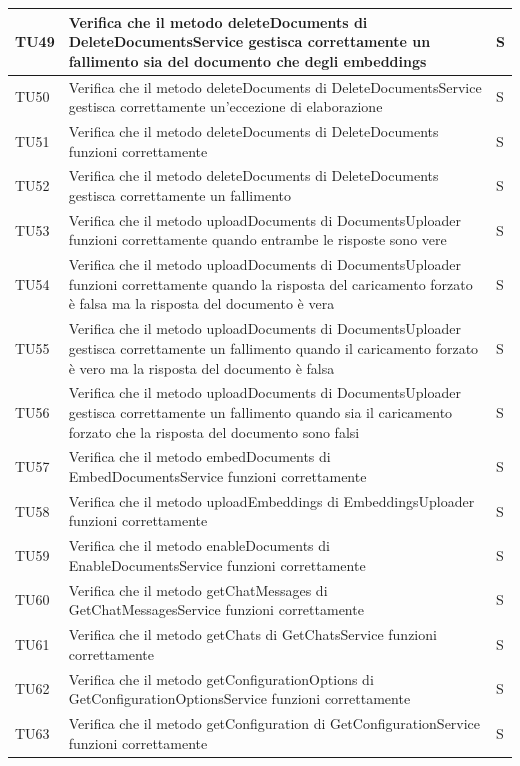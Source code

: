 \documentclass[10pt, a4paper]{article}
\begin{document}
\begin{xltabular}{\textwidth}{p{0.12\textwidth}|p{0.7\textwidth}|X}
\hline
TU49 & Verifica che il metodo deleteDocuments di DeleteDocumentsService gestisca correttamente un fallimento sia del documento che degli embeddings & S \\
\hline
TU50 & Verifica che il metodo deleteDocuments di DeleteDocumentsService gestisca correttamente un'eccezione di elaborazione & S \\
\hline
TU51 & Verifica che il metodo deleteDocuments di DeleteDocuments funzioni correttamente & S \\
\hline
TU52 & Verifica che il metodo deleteDocuments di DeleteDocuments gestisca correttamente un fallimento & S \\
\hline
TU53 & Verifica che il metodo uploadDocuments di DocumentsUploader funzioni correttamente quando entrambe le risposte sono vere & S \\
\hline
TU54 & Verifica che il metodo uploadDocuments di DocumentsUploader funzioni correttamente quando la risposta del caricamento forzato è falsa ma la risposta del documento è vera & S \\
\hline
TU55 & Verifica che il metodo uploadDocuments di DocumentsUploader gestisca correttamente un fallimento quando il caricamento forzato è vero ma la risposta del documento è falsa & S \\
\hline
TU56 & Verifica che il metodo uploadDocuments di DocumentsUploader gestisca correttamente un fallimento quando sia il caricamento forzato che la risposta del documento sono falsi & S \\
\hline
TU57 & Verifica che il metodo embedDocuments di EmbedDocumentsService funzioni correttamente & S \\
\hline
TU58 & Verifica che il metodo uploadEmbeddings di EmbeddingsUploader funzioni correttamente & S \\
\hline
TU59 & Verifica che il metodo enableDocuments di EnableDocumentsService funzioni correttamente & S \\
\hline
TU60 & Verifica che il metodo getChatMessages di GetChatMessagesService funzioni correttamente & S \\
\hline
TU61 & Verifica che il metodo getChats di GetChatsService funzioni correttamente & S \\
\hline
TU62 & Verifica che il metodo getConfigurationOptions di GetConfigurationOptionsService funzioni correttamente & S \\
\hline
TU63 & Verifica che il metodo getConfiguration di GetConfigurationService funzioni correttamente & S \\
\hline

\end{xltabular}
\end{document}
